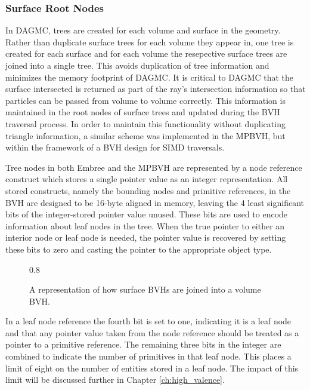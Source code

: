 \subsubsection{Surface Root Nodes}

In DAGMC, trees are created for each volume and surface in the geometry. Rather
than duplicate surface trees for each volume they appear in, one tree is created
for each surface and for each volume the resepective surface trees are joined
into a single tree. This avoids duplication of tree information and minimizes
the memory footprint of DAGMC. It is critical to DAGMC that the surface
intersected is returned as part of the ray's intersection information so that
particles can be passed from volume to volume correctly. This information is
maintained in the root nodes of surface trees and updated during the BVH
traversal process. In order to maintain this functionality without duplicating
triangle information, a similar scheme was implemented in the MPBVH, but within
the framework of a BVH design for SIMD traversals.

Tree nodes in both Embree and the MPBVH are represented by a node
reference construct which stores a single pointer value as an integer
representation. All stored constructs, namely the bounding nodes and primitive
references, in the BVH are designed to be 16-byte aligned in memory, leaving the
4 least significant bits of the integer-stored pointer value unused. These bits
are used to encode information about leaf nodes in the tree. When the true
pointer to either an interior node or leaf node is needed, the pointer value is
recovered by setting these bits to zero and casting the pointer to the
appropriate object type.

\begin{figure}[H]
  \centering
  {0.8\textwidth}
  \caption{A representation of how surface BVHs are joined into a volume BVH.}
  \label{fig:quad_tree_sets}
\end{figure}

In a leaf node reference the fourth bit is set to one, indicating it is a leaf
node and that any pointer value taken from the node reference should be treated
as a pointer to a primitive reference. The remaining three bits in the integer are
combined to indicate the number of primitives in that leaf node. This places a
limit of eight on the number of entities stored in a leaf node. The impact of
this limit will be discussed further in Chapter \ref{ch:high_valence}.

